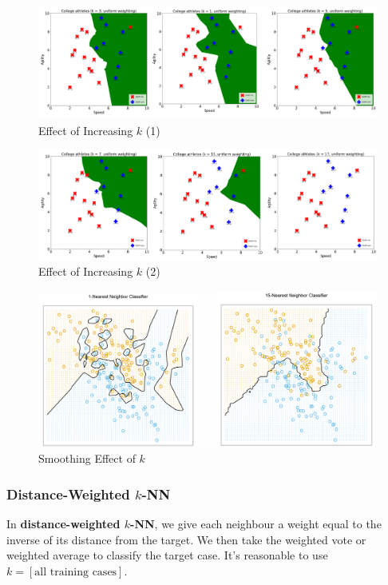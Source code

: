 \documentclass[a4paper,11pt]{article}
\begin{document}
\begin{figure}[H]
    \centering
    \includegraphics[width=\textwidth]{images/increasingk.png}
    \caption{Effect of Increasing $k$ (1)}
\end{figure}

\begin{figure}[H]
    \centering
    \includegraphics[width=\textwidth]{images/increasingk2.png}
    \caption{Effect of Increasing $k$ (2)}
\end{figure}

\begin{figure}[H]
    \centering
    \includegraphics[width=\textwidth]{images/smoothingeffectk.png}
    \caption{Smoothing Effect of $k$}
\end{figure}

\subsubsection{Distance-Weighted $k$-NN}
In \textbf{distance-weighted $k$-NN}, we give each neighbour a weight equal to the inverse of its distance from the target.
We then take the weighted vote or weighted average to classify the target case.
It's reasonable to use $k = [\text{all training cases}]$.
\end{document}
